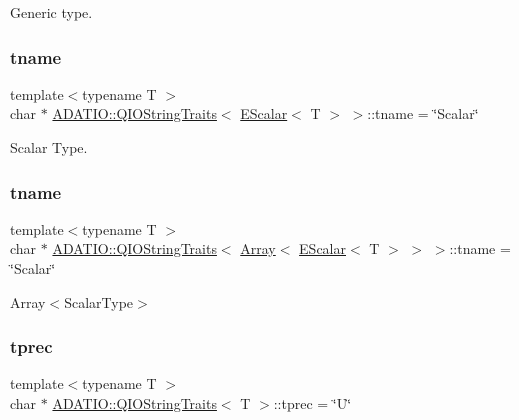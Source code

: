 Generic type. 

\mbox{\label{group__qio_gaf5e0f914e1c7e78a69472bffe5e470b7}} 
\subsubsection{\texorpdfstring{tname}{tname}\hspace{0.1cm}{\footnotesize\ttfamily [2/3]}}
{\footnotesize\ttfamily template$<$typename T $>$ \\
char $\ast$ \mbox{\hyperlink{structADATIO_1_1QIOStringTraits}{A\+D\+A\+T\+I\+O\+::\+Q\+I\+O\+String\+Traits}}$<$ \mbox{\hyperlink{classENSEM_1_1EScalar}{E\+Scalar}}$<$ T $>$ $>$\+::tname = \char`\"{}Scalar\char`\"{}\hspace{0.3cm}{\ttfamily [static]}}



Scalar Type. 

\mbox{\label{group__qio_gab84af1dfbd36e1ce7eebd1603b371727}} 
\subsubsection{\texorpdfstring{tname}{tname}\hspace{0.1cm}{\footnotesize\ttfamily [3/3]}}
{\footnotesize\ttfamily template$<$typename T $>$ \\
char $\ast$ \mbox{\hyperlink{structADATIO_1_1QIOStringTraits}{A\+D\+A\+T\+I\+O\+::\+Q\+I\+O\+String\+Traits}}$<$ \mbox{\hyperlink{classXMLArray_1_1Array}{Array}}$<$ \mbox{\hyperlink{classENSEM_1_1EScalar}{E\+Scalar}}$<$ T $>$ $>$ $>$\+::tname = \char`\"{}Scalar\char`\"{}\hspace{0.3cm}{\ttfamily [static]}}



Array$<$\+Scalar\+Type$>$ 

\mbox{\label{group__qio_ga94d948248c229ef3f2935069425f550a}} 
\subsubsection{\texorpdfstring{tprec}{tprec}\hspace{0.1cm}{\footnotesize\ttfamily [1/3]}}
{\footnotesize\ttfamily template$<$typename T $>$ \\
char $\ast$ \mbox{\hyperlink{structADATIO_1_1QIOStringTraits}{A\+D\+A\+T\+I\+O\+::\+Q\+I\+O\+String\+Traits}}$<$ T $>$\+::tprec = \char`\"{}U\char`\"{}\hspace{0.3cm}{\ttfamily [static]}}



